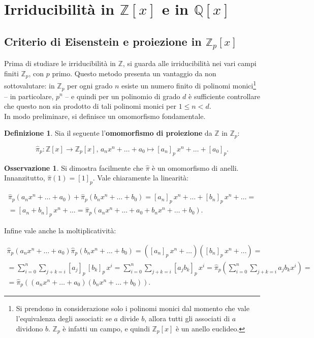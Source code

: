 \documentclass[a4paper]{article}
\newcommand{\ZZ}{\mathbb{Z}}
\newcommand{\ZZp}{\mathbb{Z}_p}
\newcommand{\QQx}{\mathbb{Q}[x]}
\newcommand{\ZZpx}{\mathbb{Z}_p[x]}
\newcommand{\ZZx}{\mathbb{Z}[x]}
\newcommand{\hatpi}{\hat{\pi}}
\newcommand{\hatpip}{\hat{\pi}_p}
\theoremstyle{definition}
\newtheorem{definition}{Definizione}[section]
\newtheorem*{note}{Osservazione}
\begin{document}
\section{Irriducibilità in $\ZZx$ e in $\QQx$}

\subsection{Criterio di Eisenstein e proiezione in $\ZZpx$}

Prima di studiare le irriducibilità in $\ZZ$, si guarda
alle irriducibilità nei vari campi finiti $\ZZp$, con
$p$ primo. Questo metodo presenta un vantaggio da non
sottovalutare: in $\ZZp$ per ogni grado $n$ esiste un
numero finito di polinomi monici\footnote{Si prendono in
    considerazione solo i polinomi monici dal momento che vale
    l'equivalenza degli associati: se $a$ divide $b$, allora
    tutti gli associati di $a$ dividono $b$. $\ZZp$ è infatti
    un campo, e quindi $\ZZpx$ è un anello euclideo.} -- in particolare, $p^n$ --
e quindi per un polinomio di grado $d$ è sufficiente controllare
che questo non sia prodotto di tali polinomi monici per
$1 \leq n < d$. \\

In modo preliminare, si definisce un omomorfismo fondamentale.

\begin{definition}
    Sia il seguente l'\textbf{omomorfismo di proiezione} da
    $\ZZ$ in $\ZZp$:

    \[ \hatpip : \ZZx \to \ZZpx,\, a_n x^n + \ldots + a_0 \mapsto [a_n]_p \, x^n + \ldots + [a_0]_p. \]
\end{definition}

\begin{note}
    Si dimostra facilmente che $\hatpi$ è un omomorfismo di anelli.
    Innanzitutto, $\hatpi(1) = [1]_p$. Vale chiaramente la linearità:

    \begin{multline*}
        \hatpip(a_n x^n + \ldots + a_0) + \hatpip(b_n x^n + \ldots + b_0) = [a_n]_p \, x^n + \ldots + [b_n]_p \, x^n + \ldots = \\
        = [a_n+b_n]_p \, x^n + \ldots = \hatpip(a_n x^n + \ldots + a_0 + b_n x^n + \ldots + b_0).
    \end{multline*}

    Infine vale anche la moltiplicatività:

    \begin{multline*}
        \hatpip(a_n x^n + \ldots + a_0) \hatpip(b_n x^n + \ldots + b_0) = ([a_n]_p \, x^n + \ldots)([b_n]_p \, x^n + \ldots) = \\
        = \sum_{i=0}^n \sum_{j+k=i} [a_j]_p \, [b_k]_p \, x^i
        = \sum_{i=0}^n \sum_{j+k=i} [a_j b_k]_p \, x^i
        = \hatpip\left(\sum_{i=0}^n \sum_{j+k=i} a_j b_k x^i\right) = \\
        =\hatpip\left((a_n x^n + \ldots + a_0)(b_n x^n + \ldots + b_0)\right).
    \end{multline*}
\end{note}
\end{document}
